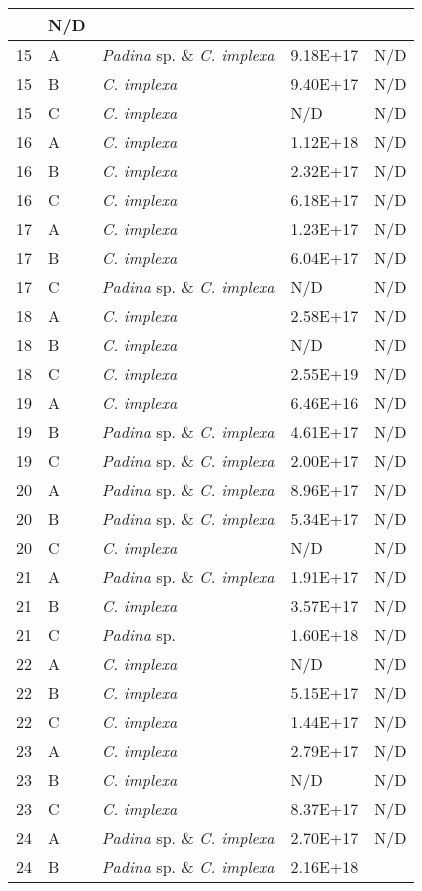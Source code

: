 \documentclass[12pt]{article}
\begin{document}
\begin{longtable}{ | p{1cm} | p{1cm} | p{3cm} | p{4cm} | p{4cm} | }
&N/D\\
\hline
15&A&\emph{Padina} sp. \& \emph{C. implexa}&9.18E+17
&N/D\\
\hline
15&B&\emph{C. implexa}&9.40E+17
&N/D\\
\hline
15&C&\emph{C. implexa}&N/D&N/D\\
\hline
16&A&\emph{C. implexa}&1.12E+18
&N/D\\
\hline
16&B&\emph{C. implexa}&2.32E+17
&N/D\\
\hline
16&C&\emph{C. implexa}&6.18E+17
&N/D\\
\hline
17&A&\emph{C. implexa}&1.23E+17
&N/D\\
\hline
17&B&\emph{C. implexa}&6.04E+17
&N/D\\
\hline
17&C&\emph{Padina} sp. \& \emph{C. implexa}&N/D&N/D\\
\hline
18&A&\emph{C. implexa}&2.58E+17
&N/D\\
\hline
18&B&\emph{C. implexa}&N/D&N/D\\
\hline
18&C&\emph{C. implexa}&2.55E+19
&N/D\\
\hline
19&A&\emph{C. implexa}&6.46E+16
&N/D\\
\hline
19&B&\emph{Padina} sp. \& \emph{C. implexa}&4.61E+17
&N/D\\
\hline
19&C&\emph{Padina} sp. \& \emph{C. implexa}&2.00E+17
&N/D\\
\hline
20&A&\emph{Padina} sp. \& \emph{C. implexa}&8.96E+17
&N/D\\
\hline
20&B&\emph{Padina} sp. \& \emph{C. implexa}&5.34E+17
&N/D\\
\hline
20&C&\emph{C. implexa}&N/D&N/D\\
\hline
21&A&\emph{Padina} sp. \& \emph{C. implexa}&1.91E+17
&N/D\\
\hline
21&B&\emph{C. implexa}&3.57E+17
&N/D\\
\hline
21&C&\emph{Padina} sp.&1.60E+18
&N/D\\
\hline
22&A&\emph{C. implexa}&N/D&N/D\\
\hline
22&B&\emph{C. implexa}&5.15E+17
&N/D\\
\hline
22&C&\emph{C. implexa}&1.44E+17
&N/D\\
\hline
23&A&\emph{C. implexa}&2.79E+17
&N/D\\
\hline
23&B&\emph{C. implexa}&N/D&N/D\\
\hline
23&C&\emph{C. implexa}&8.37E+17
&N/D\\
\hline
24&A&\emph{Padina} sp. \& \emph{C. implexa}&2.70E+17
&N/D\\
\hline
24&B&\emph{Padina} sp. \& \emph{C. implexa}&2.16E+18

\end{longtable}
\end{document}

